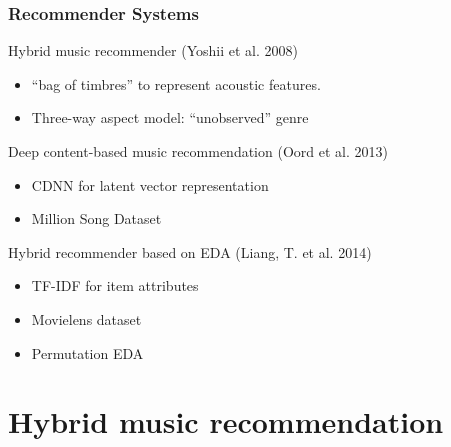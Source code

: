 \documentclass{beamer}
\begin{document}
\begin{frame}
\frametitle{Recommender Systems}
Hybrid music recommender (Yoshii et al. 2008)
\begin{itemize}
	\item ``bag of timbres'' to represent acoustic features.
	\item Three-way aspect model: ``unobserved'' genre
\end{itemize}
\pause Deep content-based music recommendation (Oord et al. 2013)
\begin{itemize}
	\item CDNN for latent vector representation
	\item Million Song Dataset
\end{itemize}
\pause Hybrid recommender based on EDA (Liang, T. et al. 2014)
\begin{itemize}
	\item TF-IDF for item attributes
	\item Movielens dataset
	\item Permutation EDA
\end{itemize}



\end{frame}

\section{Hybrid music recommendation}
\end{document}
